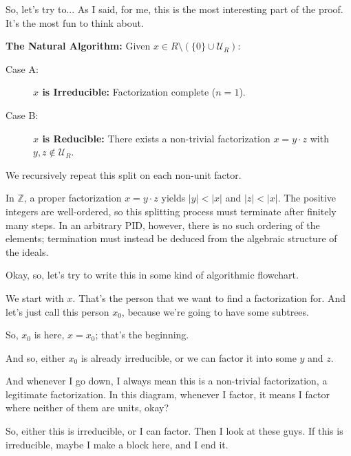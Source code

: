 \begin{proofWrapper}
\begin{speech}[01:00:37 - 01:02:42]
So, let's try to... As I said, for me, this is the most interesting part of the proof. It's the most fun to think about. 
\end{speech}

\begin{content}
\textbf{The Natural Algorithm:}
Given $x \in R \setminus (\{0\} \cup \mathcal{U}_R)$:
\begin{description}
    \item[Case A:] \textbf{$x$ is Irreducible:} Factorization complete ($n = 1$).
    \item[Case B:] \textbf{$x$ is Reducible:} There exists a non-trivial factorization $x = y \cdot z$ with $y, z \notin \mathcal{U}_R$.
\end{description}
We recursively repeat this split on each non-unit factor.

\begin{steps}
In $\mathbb{Z}$, a proper factorization $x = y \cdot z$ yields $|y| < |x|$ and $|z| < |x|$. The positive integers are well-ordered, so this splitting process must terminate after finitely many steps. In an arbitrary PID, however, there is no such ordering of the elements; termination must instead be deduced from the algebraic structure of the ideals.
\end{steps}
\end{content}

\begin{speech}[01:02:42 - 01:04:42]
Okay, so, let's try to write this in some kind of algorithmic flowchart.

We start with $x$. That's the person that we want to find a factorization for. And let's just call this person $x_0$, because we're going to have some subtrees. 

So, $x_0$ is here, $x = x_0$; that's the beginning.

And so, either $x_0$ is already irreducible, or we can factor it into some $y$ and $z$. 

And whenever I go down, I always mean this is a non-trivial factorization, a legitimate factorization. In this diagram, whenever I factor, it means I factor where neither of them are units, okay?

So, either this is irreducible, or I can factor. Then I look at these guys. If this is irreducible, maybe I make a block here, and I end it. 


\end{speech}
\end{proofWrapper}
